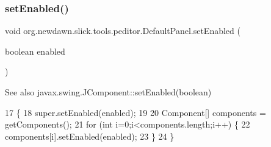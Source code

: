 \subsubsection{\texorpdfstring{set\+Enabled()}{setEnabled()}}
{\footnotesize\ttfamily void org.\+newdawn.\+slick.\+tools.\+peditor.\+Default\+Panel.\+set\+Enabled (\begin{DoxyParamCaption}\item[{boolean}]{enabled }\end{DoxyParamCaption})\hspace{0.3cm}{\ttfamily [inline]}}

\begin{DoxySeeAlso}{See also}
javax.\+swing.\+J\+Component\+::set\+Enabled(boolean) 
\end{DoxySeeAlso}

\begin{DoxyCode}
17                                             \{
18         super.setEnabled(enabled);
19         
20         Component[] components = getComponents();
21         \textcolor{keywordflow}{for} (\textcolor{keywordtype}{int} i=0;i<components.length;i++) \{
22             components[i].setEnabled(enabled);
23         \}
24     \}
\end{DoxyCode}
